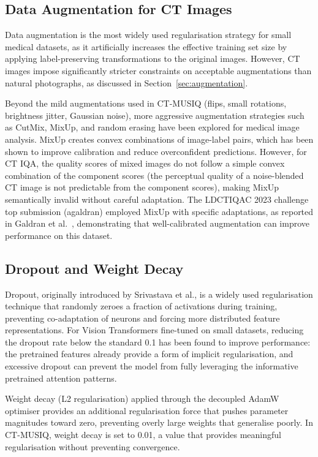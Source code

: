 \subsection{Data Augmentation for CT Images}

Data augmentation is the most widely used regularisation strategy for small medical
datasets, as it artificially increases the effective training set size by applying
label-preserving transformations to the original images. However, CT images impose
significantly stricter constraints on acceptable augmentations than natural photographs,
as discussed in Section~\ref{sec:augmentation}.

Beyond the mild augmentations used in CT-MUSIQ (flips, small rotations, brightness
jitter, Gaussian noise), more aggressive augmentation strategies such as CutMix, MixUp,
and random erasing have been explored for medical image analysis. MixUp creates
convex combinations of image-label pairs, which has been shown to improve calibration
and reduce overconfident predictions. However, for CT IQA, the quality scores of mixed
images do not follow a simple convex combination of the component scores (the perceptual
quality of a noise-blended CT image is not predictable from the component scores),
making MixUp semantically invalid without careful adaptation. The LDCTIQAC 2023 challenge
top submission (agaldran) employed MixUp with specific adaptations, as reported in
Galdran et al.\ \cite{galdran2022calibration}, demonstrating that well-calibrated
augmentation can improve performance on this dataset.

\subsection{Dropout and Weight Decay}

Dropout, originally introduced by Srivastava et al., is a widely used regularisation
technique that randomly zeroes a fraction of activations during training, preventing
co-adaptation of neurons and forcing more distributed feature representations. For
Vision Transformers fine-tuned on small datasets, reducing the dropout rate below the
standard 0.1 has been found to improve performance: the pretrained features already
provide a form of implicit regularisation, and excessive dropout can prevent the model
from fully leveraging the informative pretrained attention patterns.

Weight decay (L2 regularisation) applied through the decoupled AdamW optimiser provides
an additional regularisation force that pushes parameter magnitudes toward zero,
preventing overly large weights that generalise poorly. In CT-MUSIQ, weight decay is
set to 0.01, a value that provides meaningful regularisation without preventing
convergence.

